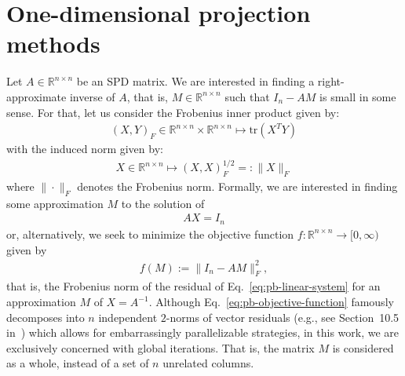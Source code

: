 \documentclass[numbers,webpdf,imanum]{ima-authoring-template}%
\theoremstyle{thmstyletwo}%
\numberwithin{equation}{section}
\begin{document}
\section{One-dimensional projection methods}\label{sec:one-dim-proj}
Let $A\in\mathbb{R}^{n\times n}$ be an SPD matrix.
We are interested in finding a right-approximate inverse of $A$, that is, $M\in\mathbb{R}^{n\times n}$ such that $I_n-AM$ is small in some sense.
For that, let us consider the Frobenius inner product given by:
\begin{align}
(X,Y)_F\in\mathbb{R}^{n\times n}\times\mathbb{R}^{n\times n}\mapsto \text{tr}(X^TY)
\end{align}
with the induced norm given by:
\begin{align}
X\in\mathbb{R}^{n\times n}\mapsto(X,X)_F^{1/2}=:\|X\|_F
\end{align}
where $\|\cdot\|_F$ denotes the Frobenius norm.
Formally, we are interested in finding some approximation $M$ to the solution of
\begin{align}\label{eq:pb-linear-system}
AX=I_n
\end{align}
or, alternatively, we seek to minimize the objective function $f:\mathbb{R}^{n\times n}\rightarrow[0,\infty)$ given by
\begin{align}\label{eq:pb-objective-function}
f(M):=\|I_n-AM\|_F^2,
\end{align}
that is, the Frobenius norm of the residual of Eq.~\eqref{eq:pb-linear-system} for an approximation $M$ of $X=A^{-1}$.
Although Eq.~\eqref{eq:pb-objective-function} famously decomposes into $n$ independent $2$-norms of vector residuals (e.g., see Section~10.5 in~\cite{Saad2003SparseBook}) which allows for embarrassingly parallelizable strategies, in this work, we are exclusively concerned with global iterations.
That is, the matrix $M$ is considered as a whole, instead of a set of $n$ unrelated columns.
\end{document}
